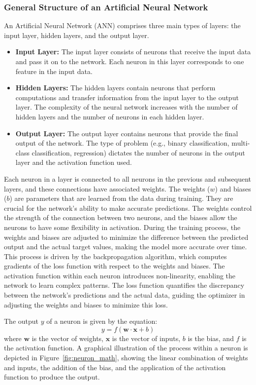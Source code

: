 \subsubsection*{General Structure of an Artificial Neural Network}
An Artificial Neural Network (ANN) comprises three main types of layers: the input layer, hidden layers, and the output layer. 

\begin{itemize}
    \item \textbf{Input Layer:} The input layer consists of neurons that receive the input data and pass it on to the network. Each neuron in this layer corresponds to one feature in the input data.
    \item \textbf{Hidden Layers:} The hidden layers contain neurons that perform computations and transfer information from the input layer to the output layer. The complexity of the neural network increases with the number of hidden layers and the number of neurons in each hidden layer.
    \item \textbf{Output Layer:} The output layer contains neurons that provide the final output of the network. The type of problem (e.g., binary classification, multi-class classification, regression) dictates the number of neurons in the output layer and the activation function used.
\end{itemize}

Each neuron in a layer is connected to all neurons in the previous and subsequent layers, and these connections have associated weights. The weights (\(w\)) and biases (\(b\)) are parameters that are learned from the data during training. They are crucial for the network's ability to make accurate predictions. The weights control the strength of the connection between two neurons, and the biases allow the neurons to have some flexibility in activation. During the training process, the weights and biases are adjusted to minimize the difference between the predicted output and the actual target values, making the model more accurate over time. This process is driven by the backpropagation algorithm, which computes gradients of the loss function with respect to the weights and biases. The activation function within each neuron introduces non-linearity, enabling the network to learn complex patterns. The loss function quantifies the discrepancy between the network's predictions and the actual data, guiding the optimizer in adjusting the weights and biases to minimize this loss.

The output \( y \) of a neuron is given by the equation:
\[
y = f(\mathbf{w} \cdot \mathbf{x} + b)
\]
where \( \mathbf{w} \) is the vector of weights, \( \mathbf{x} \) is the vector of inputs, \( b \) is the bias, and \( f \) is the activation function. A graphical illustration of the process within a neuron is depicted in Figure~\ref{fig:neuron_math}, showing the linear combination of weights and inputs, the addition of the bias, and the application of the activation function to produce the output.

